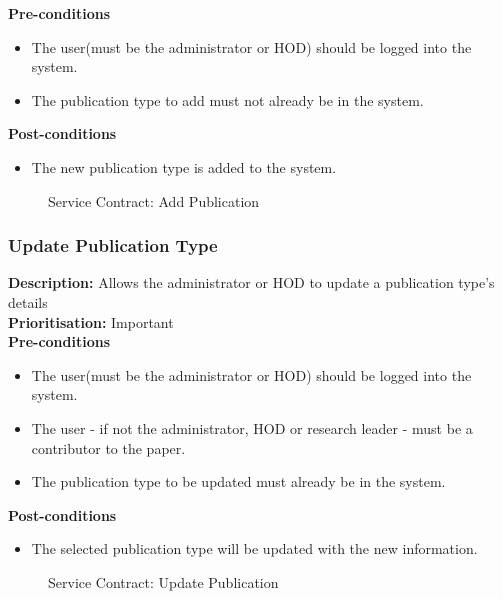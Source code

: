 \documentclass[a4paper]{article}
\begin{document}
	
	\textbf{Pre-conditions}
	\begin{itemize}
		\item The user(must be the administrator or HOD) should be logged into the system.
		\item The publication type to add must not already be in the system.
	\end{itemize}
	
	\textbf{Post-conditions}
	\begin{itemize}
		\item The new publication type is added to the system.
	\end{itemize}
	
	
	\begin{figure}[H]
		\centering
		\caption{Service Contract: Add Publication}
	\end{figure}
	
	\pagebreak
	\subsubsection{Update Publication Type}
	
	\textbf{Description:} Allows the administrator or HOD to update a publication type's details\\
	\textbf{Prioritisation:} Important\\
	
	
	\textbf{Pre-conditions}
	\begin{itemize}
		\item The user(must be the administrator or HOD) should be logged into the system.
		\item The user - if not the administrator, HOD or research leader - must be a contributor to the paper.
		\item The publication type to be updated must already be in the system.
	\end{itemize}
	
	\textbf{Post-conditions}
	\begin{itemize}
		\item The selected publication type will be updated with the new information.
	\end{itemize}
	
	\begin{figure}[H]
		\centering
		\caption{Service Contract: Update Publication}
	\end{figure}
	
\end{document}

